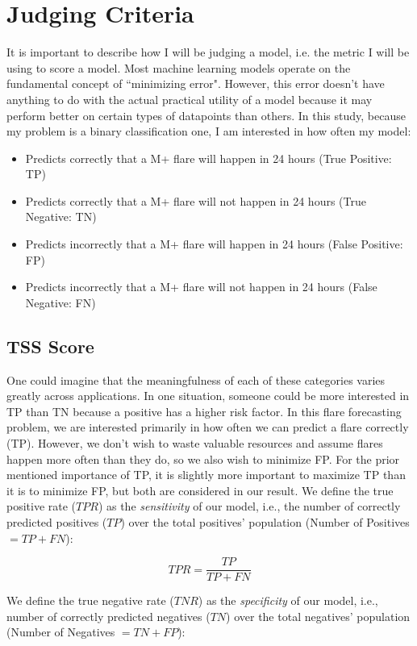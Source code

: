 
\chapter{Judging Criteria}
\label{appendix:judjingcriteria}

It is important to describe how I will be judging a model, i.e. the metric I will be using to score a model. Most machine learning models operate on the fundamental concept of ``minimizing error". However, this error doesn't have anything to do with the actual practical utility of a model because it may perform better on certain types of datapoints than others. In this study, because my problem is a binary classification one, I am interested in how often my model:

\begin{itemize}
    \item Predicts correctly that a M+ flare will happen in 24 hours (True Positive: TP)
    \item Predicts correctly that a M+ flare will not happen in 24 hours (True Negative: TN)
    \item Predicts incorrectly that a M+ flare will happen in 24 hours (False Positive: FP)
    \item Predicts incorrectly that a M+ flare will not happen in 24 hours (False Negative: FN)
\end{itemize}

\section{TSS Score}
One could imagine that the meaningfulness of each of these categories varies greatly across applications. In one situation, someone could be more interested in TP than TN because a positive has a higher risk factor. In this flare forecasting problem, we are interested primarily in how often we can predict a flare correctly (TP). However, we don't wish to waste valuable resources and assume flares happen more often than they do, so we also wish to minimize FP. For the prior mentioned importance of TP, it is slightly more important to maximize TP than it is to minimize FP, but both are considered in our result. We define the true positive rate ($TPR$) as the \textit{sensitivity} of our model, i.e., the number of correctly predicted positives ($TP$) over the total positives' population (Number of Positives $= TP + FN$):

$$TPR = \frac{TP}{TP + FN}$$

We define the true negative rate ($TNR$) as the \textit{specificity} of our model, i.e., number of correctly predicted negatives ($TN$) over the total negatives' population (Number of Negatives $= TN + FP$):

